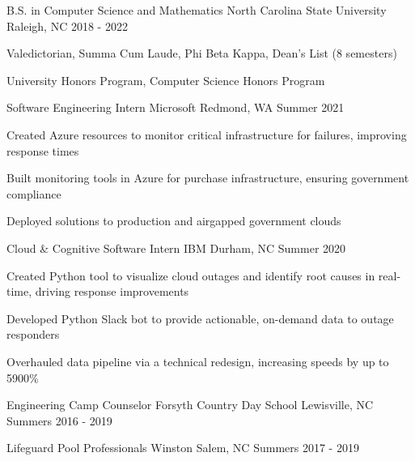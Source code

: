 \documentclass[12pt, a4paper]{awesome-cv}
\begin{document}
	
	\makecvheader[C]
	
	
	\begin{cventries}
		\cventry
		{B.S. in Computer Science and Mathematics}	%
		{North Carolina State University} 			%
		{Raleigh, NC} 								%
		{2018 - 2022} 					%
		{
			\begin{cvitems}
				\item {Valedictorian, Summa Cum Laude, Phi Beta Kappa, Dean's List (8 semesters)}
				\item {University Honors Program, Computer Science Honors Program}
			\end{cvitems}
		}
	\end{cventries}

	\cvsection{Experience}
	\begin{cventries}
		\cventry
		{Software Engineering Intern} %
		{Microsoft} %
		{Redmond, WA} %
		{Summer 2021} %
		{
			\begin{cvitems} %
				\item {Created Azure resources to monitor critical infrastructure for failures, improving response times}
				\item {Built monitoring tools in Azure for purchase infrastructure, ensuring government compliance}
				\item {Deployed solutions to production and airgapped government clouds}
			\end{cvitems}
		}
	
		\cventry
		{Cloud \& Cognitive Software Intern} %
		{IBM} %
		{Durham, NC} %
		{Summer 2020} %
		{
			\begin{cvitems} %
				\item {Created Python tool to visualize cloud outages and identify root causes in real-time, driving response improvements}
				\item {Developed Python Slack bot to provide actionable, on-demand data to outage responders}
				\item {Overhauled data pipeline via a technical redesign, increasing speeds by up to 5900\%}
			\end{cvitems}
		}
	
		\cventry
		{Engineering Camp Counselor} %
		{Forsyth Country Day School} %
		{Lewisville, NC} %
		{Summers 2016 - 2019} %
		{}
		
		\cventry
		{Lifeguard} %
		{Pool Professionals} %
		{Winston Salem, NC} %
		{Summers 2017 - 2019} %
		{}
	\end{cventries}
	
\end{document}
